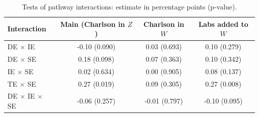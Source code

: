 \begin{table}

\caption{\label{tab:interactions}Tests of pathway interactions: estimate in percentage points (p-value).}
\centering
\begin{tabular}[t]{lccc}
\toprule
Interaction & Main (Charlson in $Z$) & Charlson in $W$ & Labs added to $W$\\
\midrule
DE $\times$ IE & -0.10 (0.090) & 0.03 (0.693) & 0.10 (0.279)\\
DE $\times$ SE & 0.18 (0.098) & 0.07 (0.363) & 0.10 (0.342)\\
IE $\times$ SE & 0.02 (0.634) & 0.00 (0.905) & 0.08 (0.137)\\
TE $\times$ SE & 0.27 (0.019) & 0.09 (0.305) & 0.27 (0.008)\\
DE $\times$ IE $\times$ SE & -0.06 (0.257) & -0.01 (0.797) & -0.10 (0.095)\\
\bottomrule
\end{tabular}
\end{table}
